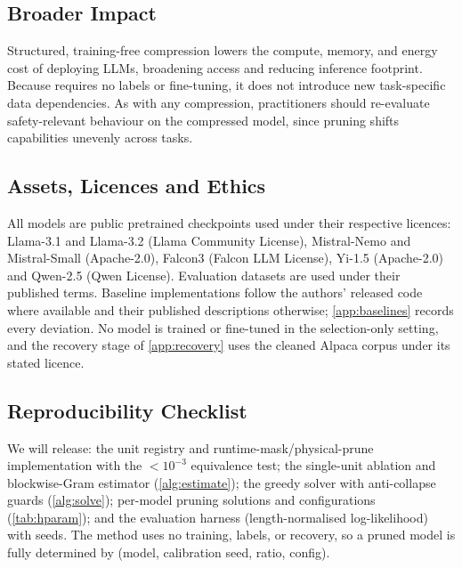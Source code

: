 \subsection{Broader Impact}

\label{app:impact}
Structured, training-free compression lowers the compute, memory, and energy cost of deploying LLMs,
broadening access and reducing inference footprint. Because \method requires no labels or fine-tuning,
it does not introduce new task-specific data dependencies. As with any compression, practitioners
should re-evaluate safety-relevant behaviour on the compressed model, since pruning shifts
capabilities unevenly across tasks.
\subsection{Assets, Licences and Ethics}
All models are public pretrained checkpoints used under their respective licences: Llama-3.1 and
Llama-3.2 (Llama Community License), Mistral-Nemo and Mistral-Small (Apache-2.0), Falcon3 (Falcon
LLM License), Yi-1.5 (Apache-2.0) and Qwen-2.5 (Qwen License). Evaluation datasets are used under
their published terms. Baseline implementations follow the authors' released code where available
and their published descriptions otherwise; \cref{app:baselines} records every deviation. No model
is trained or fine-tuned in the selection-only setting, and the recovery stage of
\cref{app:recovery} uses the cleaned Alpaca corpus under its stated licence.

\subsection{Reproducibility Checklist}

\label{app:repro}
We will release: the unit registry and runtime-mask/physical-prune implementation with the
$<\!10^{-3}$ equivalence test; the single-unit ablation and blockwise-Gram estimator (\cref{alg:estimate});
the greedy solver with anti-collapse guards (\cref{alg:solve}); per-model pruning solutions and
configurations (\cref{tab:hparam}); and the evaluation harness (length-normalised log-likelihood) with seeds. The method uses no training, labels, or recovery, so a pruned model is
fully determined by (model, calibration seed, ratio, config).
